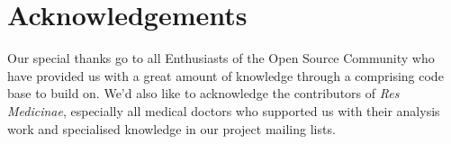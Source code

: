 %
%
%
%
%
%
%

\section{Acknowledgements}
\label{acknowledgements_heading}

Our special thanks go to all Enthusiasts of the Open Source Community who have
provided us with a great amount of knowledge through a comprising code base to
build on. We'd also like to acknowledge the contributors of \emph{Res Medicinae},
especially all medical doctors who supported us with their analysis work
\cite{resmedicinae2001} and specialised knowledge in our project mailing lists.

